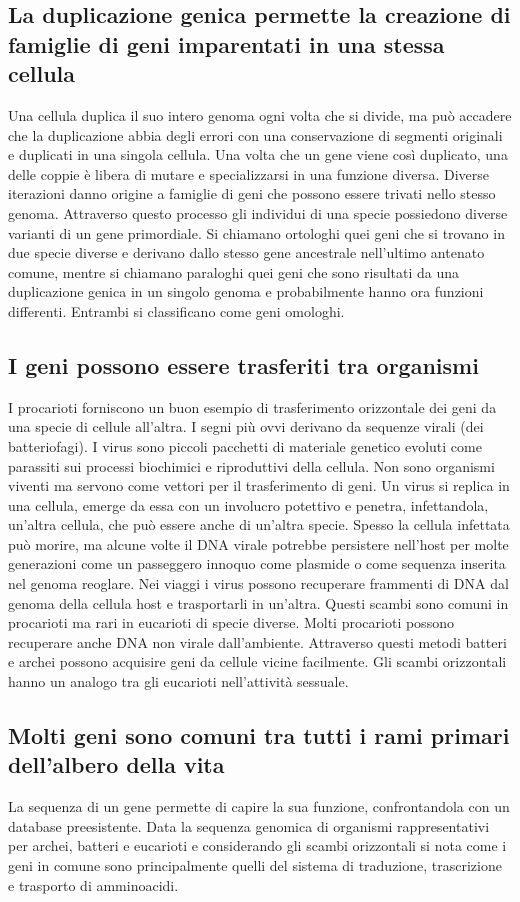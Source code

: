 \subsection{La duplicazione genica permette la creazione di famiglie di geni imparentati in una stessa cellula}
Una cellula duplica il suo intero genoma ogni volta che si divide, ma pu\`o accadere che la duplicazione abbia degli errori con una conservazione di segmenti originali e duplicati in
una singola cellula. Una volta che un gene viene cos\`i duplicato, una delle coppie \`e libera di mutare e specializzarsi in una funzione diversa. Diverse iterazioni danno origine 
a famiglie di geni che possono essere trivati nello stesso genoma. Attraverso questo processo gli individui di una specie possiedono diverse varianti di un gene primordiale. Si chiamano
ortologhi quei geni che si trovano in due specie diverse e derivano dallo stesso gene ancestrale nell'ultimo antenato comune, mentre si chiamano paraloghi quei geni che sono risultati
da una duplicazione genica in un singolo genoma e probabilmente hanno ora funzioni differenti. Entrambi si classificano come geni omologhi.
\subsection{I geni possono essere trasferiti tra organismi}
I procarioti forniscono un buon esempio di trasferimento orizzontale dei geni da una specie di cellule all'altra. I segni pi\`u ovvi derivano da sequenze virali (dei batteriofagi). I
virus sono piccoli pacchetti di materiale genetico evoluti come parassiti sui processi biochimici e riproduttivi della cellula. Non sono organismi viventi ma servono come vettori per il
trasferimento di geni. Un virus si replica in una cellula, emerge da essa con un involucro potettivo e penetra, infettandola, un'altra cellula, che pu\`o essere anche di un'altra specie.
Spesso la cellula infettata pu\`o morire, ma alcune volte il DNA virale potrebbe persistere nell'host per molte generazioni come un passeggero innoquo come plasmide o come sequenza
inserita nel genoma reoglare. Nei viaggi i virus possono recuperare frammenti di DNA dal genoma della cellula host e trasportarli in un'altra. Questi scambi sono comuni in procarioti ma
rari in eucarioti di specie diverse. Molti procarioti possono recuperare anche DNA non virale dall'ambiente. Attraverso questi metodi batteri e archei possono acquisire geni da cellule
vicine facilmente. Gli scambi orizzontali hanno un analogo tra gli eucarioti nell'attivit\`a sessuale. 
\subsection{Molti geni sono comuni tra tutti i rami primari dell'albero della vita}
La sequenza di un gene permette di capire la sua funzione, confrontandola con un database preesistente. Data la sequenza genomica di organismi rappresentativi per archei, batteri e 
eucarioti e considerando gli scambi orizzontali si nota come i geni in comune sono principalmente quelli del sistema di traduzione, trascrizione e trasporto di amminoacidi. 
